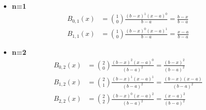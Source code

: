 \documentclass{article}
\numberwithin{equation}{section}
\begin{document}
\begin{itemize}
    \item \textbf{n=1} 
        \begin{equation*}
           \begin{aligned}
               B_{0,1}(x)&=\binom{1}{0}\frac{(b-x)^1(x-a)^0}{b-a}=\frac{b-x}{b-a}
                \\ 
               B_{1,1}(x)&=\binom{1}{0}\frac{(b-x)^0(x-a)^1}{b-a}=\frac{x-a}{b-a} 
           \end{aligned} 
        \end{equation*}
        \begin{center}
        \end{center}
    \item \textbf{n=2}
        \begin{equation*}
           \begin{aligned}
               B_{0,2}(x)&=\binom{2}{0}\frac{(b-x)^2(x-a)^0}{(b-a)^2}=\frac{(b-x)^2}{(b-a)^2}
               \\ 
               B_{1,2}(x)&=\binom{2}{1}\frac{(b-x)^1(x-a)^1}{(b-a)^2}=\frac{(b-x)(x-a)}{(b-a)^2}
               \\
               B_{2,2}(x)&=\binom{2}{2}\frac{(b-x)^0(x-a)^2}{(b-a)^2}=\frac{(x-a)^2}{(b-a)^2}
           \end{aligned} 
        \end{equation*}
        \begin{center}
        \end{center}
\end{itemize}
\end{document}
